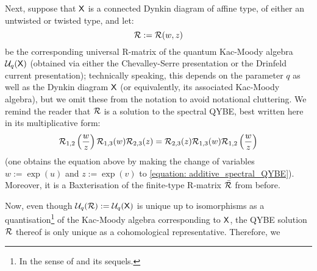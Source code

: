         Next, suppose that $\mathsf{X}$ is a connected Dynkin diagram of affine type, of either an untwisted or twisted type, and let:
            $$\mathcal{R} := \mathcal{R}(w, z)$$
        be the corresponding universal R-matrix of the quantum Kac-Moody algebra $\mathcal{U}_q(\mathsf{X})$ (obtained via either the Chevalley-Serre presentation or the Drinfeld current presentation); technically speaking, this depends on the parameter $q$ as well as the Dynkin diagram $\mathsf{X}$ (or equivalently, its associated Kac-Moody algebra), but we omit these from the notation to avoid notational cluttering. We remind the reader that $\mathcal{R}$ is a solution to the spectral QYBE, best written here in its multiplicative form:
            \begin{equation} \label{equation: constant_QYBE}
                \mathcal{R}_{1, 2}\left(\frac{w}{z}\right) \mathcal{R}_{1, 3}(w) \mathcal{R}_{2, 3}(z) = \mathcal{R}_{2, 3}(z) \mathcal{R}_{1, 3}(w) \mathcal{R}_{1, 2}\left(\frac{w}{z}\right)
            \end{equation}
        (one obtains the equation above by making the change of variables $w := \exp(u)$ and $z := \exp(v)$ to \eqref{equation: additive_spectral_QYBE}). Moreover, it is a Baxterisation of the finite-type R-matrix $\bar{\mathcal{R}}$ from before.

        Now, even though $\mathcal{U}_q(\mathcal{R}) := \mathcal{U}_q(\mathsf{X})$ is unique up to isomorphisms as a quantisation\footnote{In the sense of \cite{etingof_kazhdan_quantisation_1} and its sequels.} of the Kac-Moody algebra corresponding to $\mathsf{X}$, the QYBE solution $\mathcal{R}$ thereof is only unique as a cohomological representative. Therefore, we 

